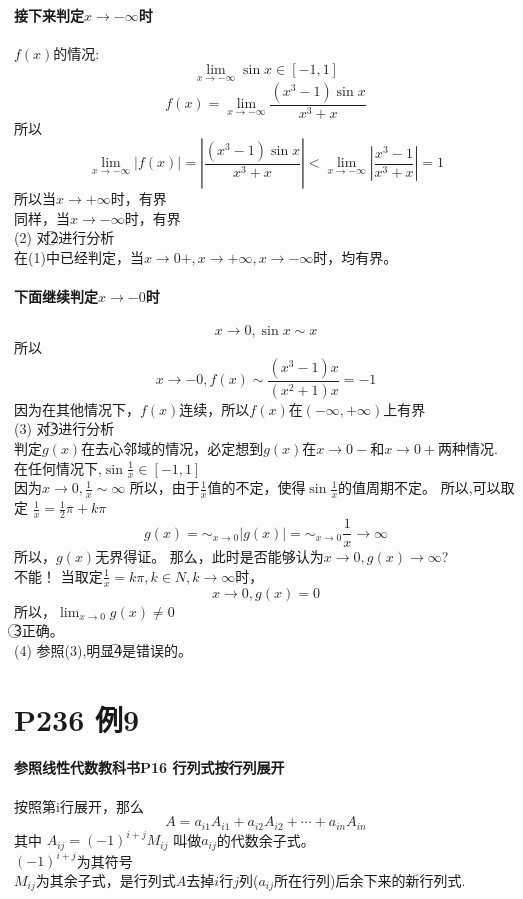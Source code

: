 \documentclass[a4paper]{ctexart}
\begin{document}
\begin{multicols}{2}
\paragraph{接下来判定$x\rightarrow -\infty$时}
$f(x)$的情况:\\
$$\lim_{x \rightarrow -\infty}{\sin{x}\in[-1,1]}$$
$$
f(x) = \lim_{x\rightarrow -\infty}{\frac{(x^3-1)\sin{x}}{x^3+x}} 
$$
所以
$$
\lim_{x \rightarrow -\infty}{\left| f(x) \right| = \left|{
        \frac{(x^3-1)\sin{x}}{x^3+x}
    } \right|}
<
\lim_{x \rightarrow -\infty}{\left|{
        \frac{x^3-1}{x^3+x}
    } \right|}
=1
$$
所以当$x\rightarrow +\infty$时，有界\\
同样，当$x\rightarrow -\infty$时，有界\\
(2) 对\textcircled{2}进行分析\\
在(1)中已经判定，当$x\rightarrow 0+, x\rightarrow +\infty, x\rightarrow -\infty$时，均有界。\\
\paragraph{下面继续判定$x\rightarrow -0$时}
$$
x\rightarrow 0, \sin{x} \sim x
$$
所以
$$
x\rightarrow -0,
f(x) \sim \frac{(x^3-1)x}{(x^2+1)x}
=
-1
$$
因为在其他情况下，$f(x)$连续，所以$f(x)$在$(-\infty, +\infty)$上有界\\
(3) 对\textcircled{3}进行分析\\
判定$g(x)$在去心邻域的情况，必定想到$g(x)$在$x\rightarrow 0-$和$x\rightarrow 0+$两种情况.\\
在任何情况下,$\sin{\frac{1}{x}} \in [-1, 1]$\\
因为$x\rightarrow 0, \frac{1}{x}\sim \infty$
所以，由于$\frac{1}{x}$值的不定，使得$\sin{\frac{1}{x}}$的值周期不定。
所以,可以取定 $\frac{1}{x}=\frac{1}{2}\pi + k\pi$
$$
g(x)=
\sim_{x\rightarrow 0}{\left| g(x) \right|}
= 
\sim_{x\rightarrow 0}{\frac{1}{x}} \rightarrow \infty 
$$
所以，$g(x)$无界得证。
那么，此时是否能够认为$x\rightarrow 0, g(x)\rightarrow \infty$?\\
不能！
当取定$\frac{1}{x}=k\pi,k\in N, k\rightarrow \infty$时，
$$
x\rightarrow 0, g(x) = 0
$$
所以，$\lim_{x\rightarrow 0}{g(x)} \neq 0$\\
\textcircled{3}正确。\\
(4) 参照(3),明显\textcircled{4}是错误的。

\section{P236 例9}
\paragraph{参照线性代数教科书P16 行列式按行列展开}
按照第i行展开，那么
$$
A = a_{i1}A_{i1} + a_{i2}A_{i2} + \cdots + a_{in}A_{in}
$$
其中 $A_{ij} = (-1)^{i+j}M_{ij}$ 叫做$a_{ij}$的代数余子式。\\
$(-1)^{i+j}$为其符号\\
$M_{ij}$为其余子式，是行列式$A$去掉$i$行$j$列($a_{ij}$所在行列)后余下来的新行列式.\\


\end{multicols}
\end{document}
